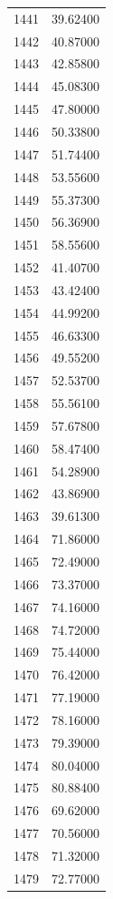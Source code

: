 \documentclass[
  letterpaper,
  DIV=11,
  numbers=noendperiod]{scrreprt}
\begin{document}
\begin{tcolorbox}
\begin{tabular}{lr}
1441 &         39.62400 \\
1442 &         40.87000 \\
1443 &         42.85800 \\
1444 &         45.08300 \\
1445 &         47.80000 \\
1446 &         50.33800 \\
1447 &         51.74400 \\
1448 &         53.55600 \\
1449 &         55.37300 \\
1450 &         56.36900 \\
1451 &         58.55600 \\
1452 &         41.40700 \\
1453 &         43.42400 \\
1454 &         44.99200 \\
1455 &         46.63300 \\
1456 &         49.55200 \\
1457 &         52.53700 \\
1458 &         55.56100 \\
1459 &         57.67800 \\
1460 &         58.47400 \\
1461 &         54.28900 \\
1462 &         43.86900 \\
1463 &         39.61300 \\
1464 &         71.86000 \\
1465 &         72.49000 \\
1466 &         73.37000 \\
1467 &         74.16000 \\
1468 &         74.72000 \\
1469 &         75.44000 \\
1470 &         76.42000 \\
1471 &         77.19000 \\
1472 &         78.16000 \\
1473 &         79.39000 \\
1474 &         80.04000 \\
1475 &         80.88400 \\
1476 &         69.62000 \\
1477 &         70.56000 \\
1478 &         71.32000 \\
1479 &         72.77000 \\

\end{tabular}
\end{tcolorbox}
\end{document}
